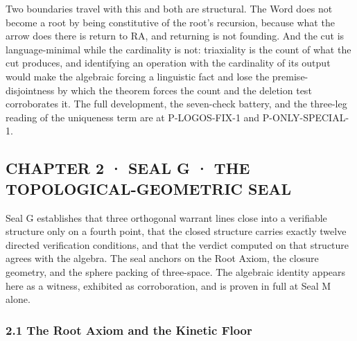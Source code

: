 \documentclass[10pt,twocolumn]{article}
\begin{document}
Two boundaries travel with this and both are structural. The Word does
not become a root by being constitutive of the root's recursion, because
what the arrow does there is return to RA, and returning is not
founding. And the cut is language-minimal while the cardinality is not:
triaxiality is the count of what the cut produces, and identifying an
operation with the cardinality of its output would make the algebraic
forcing a linguistic fact and lose the premise-disjointness by which the
theorem forces the count and the deletion test corroborates it. The full
development, the seven-check battery, and the three-leg reading of the
uniqueness term are at P-LOGOS-FIX-1 and P-ONLY-SPECIAL-1.

\hypertarget{chapter-2-seal-g-the-topological-geometric-seal}{%
\subsection{CHAPTER 2 · SEAL G · THE TOPOLOGICAL-GEOMETRIC
SEAL}\label{chapter-2-seal-g-the-topological-geometric-seal}}

Seal G establishes that three orthogonal warrant lines close into a
verifiable structure only on a fourth point, that the closed structure
carries exactly twelve directed verification conditions, and that the
verdict computed on that structure agrees with the algebra. The seal
anchors on the Root Axiom, the closure geometry, and the sphere packing
of three-space. The algebraic identity appears here as a witness,
exhibited as corroboration, and is proven in full at Seal M alone.

\hypertarget{the-root-axiom-and-the-kinetic-floor}{%
\subsubsection{2.1 The Root Axiom and the Kinetic
Floor}\label{the-root-axiom-and-the-kinetic-floor}}
\end{document}
